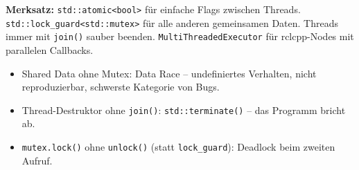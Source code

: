\begin{merksatzBox}
\textbf{Merksatz:}
\texttt{std::atomic<bool>} für einfache Flags zwischen Threads.
\texttt{std::lock\_guard<std::mutex>} für alle anderen gemeinsamen Daten.
Threads immer mit \texttt{join()} sauber beenden.
\texttt{MultiThreadedExecutor} für rclcpp-Nodes mit parallelen Callbacks.
\end{merksatzBox}

\begin{fehlerBox}
\begin{itemize}
\item Shared Data ohne Mutex: Data Race -- undefiniertes Verhalten,
  nicht reproduzierbar, schwerste Kategorie von Bugs.
\item Thread-Destruktor ohne \texttt{join()}: \texttt{std::terminate()} --
  das Programm bricht ab.
\item \texttt{mutex.lock()} ohne \texttt{unlock()} (statt \texttt{lock\_guard}):
  Deadlock beim zweiten Aufruf.
\end{itemize}
\end{fehlerBox}
